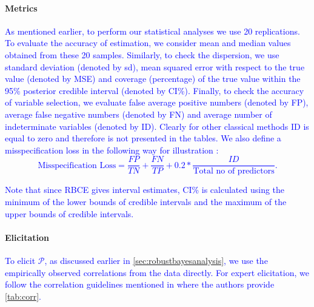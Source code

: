 \documentclass[preprint,12pt]{elsarticle}
\newcommand{\added}[1]{\textcolor{blue}{#1}}
\begin{document}
\paragraph{Metrics}

\added{ 
	As mentioned earlier, to perform our statistical analyses we use 20
	replications. To evaluate the accuracy of estimation, we consider
	mean and median values obtained from these 20 samples. Similarly, to check the
	dispersion, we use standard deviation (denoted by sd), mean squared 
	error with respect to the true value (denoted by MSE) and coverage (percentage) of the true value within the
	95\% posterior credible interval (denoted by CI\%). Finally, 
	to check the accuracy of variable selection, we evaluate false average positive numbers (denoted by FP), average false negative numbers (denoted
	by FN) and average number of indeterminate variables (denoted by ID). Clearly
	for other classical methods ID is equal to zero and therefore 
	is not presented in the tables. We also define a misspecification loss
	in the following way for illustration :
	\begin{equation}
		\text{Misspecification Loss} = \frac{FP}{TN} + \frac{FN}{TP} + 0.2* \frac{ID}{\text{Total no of predictors}}.
	\end{equation}
}

\added{Note that since RBCE gives interval estimates, CI\% is calculated using the minimum of the lower bounds of credible intervals and the maximum of the upper bounds of credible intervals.}

\paragraph{Elicitation}

\added{%
To elicit $\mathcal{P}$,
as discussed earlier in \cref{sec:robustbayesanalysis},
we use the empirically observed correlations from the data directly.
For expert elicitation, we follow the correlation guidelines mentioned in \citep{AKOGLU201891}
where the authors provide \cref{tab:corr}.}
\end{document}
